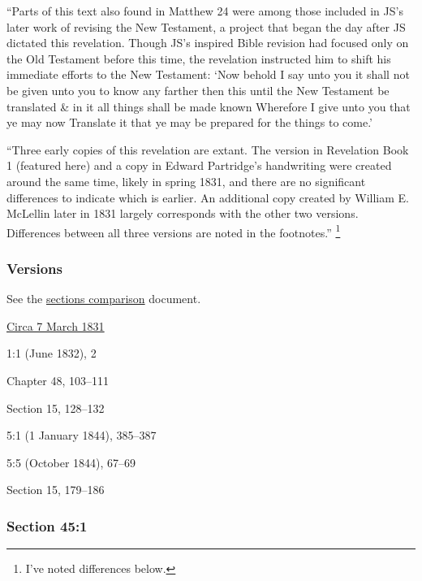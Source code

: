			``Parts of this text also found in Matthew 24 were among those included in JS's later work of revising the New Testament, a project that began the day after JS dictated this revelation. Though JS's inspired Bible revision had focused only on the Old Testament before this time, the revelation instructed him to shift his immediate efforts to the New Testament: `Now behold I say unto you it shall not be given unto you to know any farther then this until the New Testament be translated \& in it all things shall be made known Wherefore I give unto you that ye may now Translate it that ye may be prepared for the things to come.'
			
			``Three early copies of this revelation are extant. The version in Revelation Book 1 (featured here) and a copy in Edward Partridge's handwriting were created around the same time, likely in spring 1831, and there are no significant differences to indicate which is earlier. An additional copy created by William E. McLellin later in 1831 largely corresponds with the other two versions. Differences between all three versions are noted in the footnotes.''%
				\footnote{%
					I've noted differences below.
					}
		
	\subsubsection{Versions}
		\label{DC45-V}
		
		See the \href{https://drive.google.com/file/d/1goAvNz8jS4R8slYfMG_db55Ty2z_vmgK/view?usp=sharing}{sections comparison} document.
	
		\begin{compactdesc}
			\item[JSP] \hyperref[EMS-1831-JS-CIR-7-MAR-1831]{Circa 7 March 1831}
			\item[EMS] 1:1 (June 1832), 2
			\item[BC] Chapter 48, 103--111
			\item[DC 1835] Section 15, 128--132
			\item[TS] 5:1 (1 January 1844), 385--387
			\item[MS] 5:5 (October 1844), 67--69
			\item[DC 1844] Section 15, 179--186
		\end{compactdesc}

	\subsubsection{Section 45:1} %
		\label{DC45-1}

